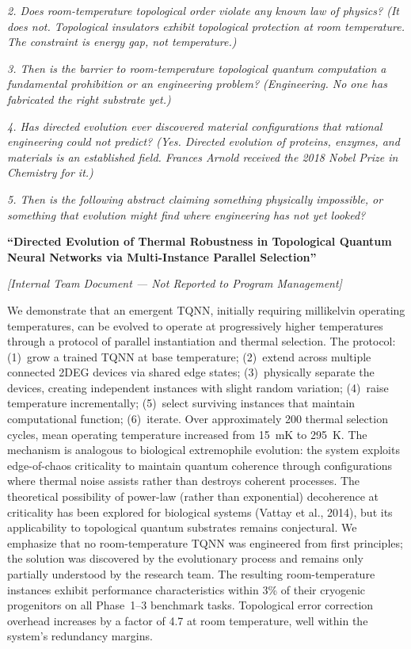 \noindent\textit{2. Does room-temperature topological order violate any known law of physics? (It does not. Topological insulators exhibit topological protection at room temperature. The constraint is energy gap, not temperature.)}

\noindent\textit{3. Then is the barrier to room-temperature topological quantum computation a fundamental prohibition or an engineering problem? (Engineering. No one has fabricated the right substrate yet.)}

\noindent\textit{4. Has directed evolution ever discovered material configurations that rational engineering could not predict? (Yes. Directed evolution of proteins, enzymes, and materials is an established field. Frances Arnold received the 2018 Nobel Prize in Chemistry for it.)}

\noindent\textit{5. Then is the following abstract claiming something physically impossible, or something that evolution might find where engineering has not yet looked?}

\vspace{0.3cm}

\textbf{``Directed Evolution of Thermal Robustness in Topological Quantum Neural Networks via Multi-Instance Parallel Selection''}

\textit{[Internal Team Document --- Not Reported to Program Management]}

\vspace{0.3cm}

We demonstrate that an emergent TQNN, initially requiring millikelvin operating temperatures, can be evolved to operate at progressively higher temperatures through a protocol of parallel instantiation and thermal selection. The protocol: (1)~grow a trained TQNN at base temperature; (2)~extend across multiple connected 2DEG devices via shared edge states; (3)~physically separate the devices, creating independent instances with slight random variation; (4)~raise temperature incrementally; (5)~select surviving instances that maintain computational function; (6)~iterate. Over approximately 200 thermal selection cycles, mean operating temperature increased from 15~mK to 295~K. The mechanism is analogous to biological extremophile evolution: the system exploits edge-of-chaos criticality to maintain quantum coherence through configurations where thermal noise assists rather than destroys coherent processes. The theoretical possibility of power-law (rather than exponential) decoherence at criticality has been explored for biological systems (Vattay et al., 2014), but its applicability to topological quantum substrates remains conjectural. We emphasize that no room-temperature TQNN was engineered from first principles; the solution was discovered by the evolutionary process and remains only partially understood by the research team. The resulting room-temperature instances exhibit performance characteristics within 3\% of their cryogenic progenitors on all Phase~1--3 benchmark tasks. Topological error correction overhead increases by a factor of 4.7 at room temperature, well within the system's redundancy margins.

